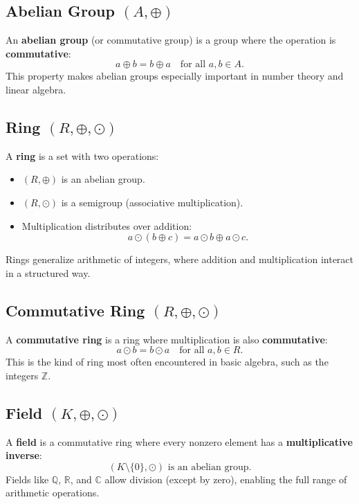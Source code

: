 \subsection{Abelian Group \((A, \oplus)\)}
An \textbf{abelian group} (or commutative group) is a group where the operation is \textbf{commutative}:
\[
a \oplus b = b \oplus a \quad \text{for all } a, b \in A.
\]
This property makes abelian groups especially important in number theory and linear algebra.

\subsection{Ring \((R, \oplus, \odot)\)}
A \textbf{ring} is a set with two operations:
\begin{itemize}[label=\(-\)]
  \item \((R, \oplus)\) is an abelian group.
  \item \((R, \odot)\) is a semigroup (associative multiplication).
  \item Multiplication distributes over addition:
  \[
  a \odot (b \oplus c) = a \odot b \oplus a \odot c.
  \]
\end{itemize}
Rings generalize arithmetic of integers, where addition and multiplication interact in a structured way.

\subsection{Commutative Ring \((R, \oplus, \odot)\)}
A \textbf{commutative ring} is a ring where multiplication is also \textbf{commutative}:
\[
a \odot b = b \odot a \quad \text{for all } a, b \in R.
\]
This is the kind of ring most often encountered in basic algebra, such as the integers \(\mathbb{Z}\).

\subsection{Field \((K, \oplus, \odot)\)}
A \textbf{field} is a commutative ring where every nonzero element has a \textbf{multiplicative inverse}:
\[
(K \setminus \{0\}, \odot) \text{ is an abelian group}.
\]
Fields like \(\mathbb{Q}\), \(\mathbb{R}\), and \(\mathbb{C}\) allow division (except by zero), enabling the full range of arithmetic operations.

